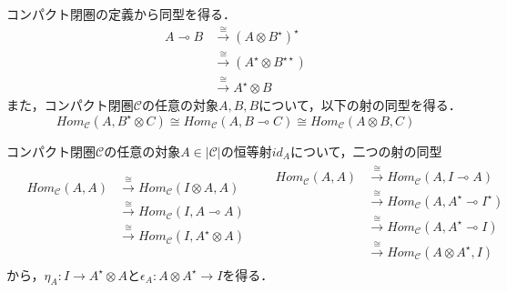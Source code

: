 \documentclass[type_judgement.tex]{subfiles}
\begin{document}
コンパクト閉圏の定義から同型を得る．
\begin{align*}
    A \multimap B &\xrightarrow{\cong} (A \otimes B^\star)^\star \\
    &\xrightarrow{\cong} (A^\star \otimes B^{\star\star}) \\
    &\xrightarrow{\cong} A^\star \otimes B
\end{align*}
また，コンパクト閉圏$\mathcal{C}$の任意の対象$A,B,B$について，以下の射の同型を得る．
\begin{equation*}
    Hom_\mathcal{C}(A, B^\star \otimes C) \cong Hom_\mathcal{C}(A, B \multimap C) \cong Hom_\mathcal{C}(A \otimes B, C)
\end{equation*}

コンパクト閉圏$\mathcal{C}$の任意の対象$A\in|\mathcal{C}|$の恒等射$id_A$について，二つの射の同型
\begin{align*}
&\begin{aligned}
    Hom_\mathcal{C}(A, A) &\xrightarrow{\cong} Hom_\mathcal{C}(I \otimes A, A) \\
    &\xrightarrow{\cong} Hom_\mathcal{C}(I, A \multimap A) \\
    &\xrightarrow{\cong} Hom_\mathcal{C}(I, A^\star \otimes A) \\
    &
\end{aligned}
&
&\begin{aligned}
    Hom_\mathcal{C}(A, A) &\xrightarrow{\cong} Hom_\mathcal{C}(A, I \multimap A) \\
    &\xrightarrow{\cong} Hom_\mathcal{C}(A, A^\star \multimap I^\star) \\
    &\xrightarrow{\cong} Hom_\mathcal{C}(A, A^\star \multimap I) \\
    &\xrightarrow{\cong} Hom_\mathcal{C}(A \otimes A^\star, I)
\end{aligned}
\end{align*}
から，$\eta_A:I \rightarrow A^\star \otimes A$と$\epsilon_A:A \otimes A^\star \rightarrow I$を得る．
\end{document}
